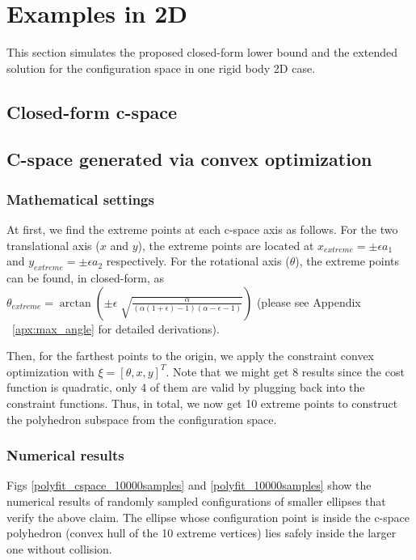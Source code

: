\documentclass{article}
\begin{document}
\section{Examples in 2D}
This section simulates the proposed closed-form lower bound and the extended solution for the configuration space in one rigid body 2D case.

\subsection{Closed-form c-space}

\subsection{C-space generated via convex optimization}
\subsubsection{Mathematical settings}
At first, we find the extreme points at each c-space axis as follows. For the two translational axis ($x$ and $y$), the extreme points are located at $x_{extreme} = \pm \epsilon a_1$ and $y_{extreme} = \pm \epsilon a_2$ respectively. For the rotational axis ($\theta$), the extreme points can be found, in closed-form, as $\theta_{extreme} = \arctan (\pm \epsilon \sqrt[]{\frac{\alpha}{(\alpha(1+\epsilon)-1)(\alpha - \epsilon - 1)}})$ (please see Appendix ~\ref{apx:max_angle} for detailed derivations).

Then, for the farthest points to the origin, we apply the constraint convex optimization with $\xi = [\theta, x, y]^T$. Note that we might get 8 results since the cost function is quadratic, only 4 of them are valid by plugging back into the constraint functions. Thus, in total, we now get 10 extreme points to construct the polyhedron subspace from the configuration space.

\subsubsection{Numerical results}
Figs \ref{polyfit_cspace_10000samples} and \ref{polyfit_10000samples} show the numerical results of randomly sampled configurations of smaller ellipses that verify the above claim. The ellipse whose configuration point is inside the c-space polyhedron (convex hull of the 10 extreme vertices) lies safely inside the larger one without collision.
\end{document}
